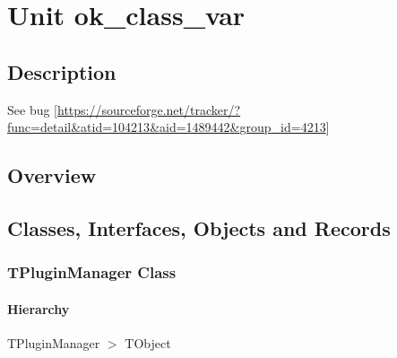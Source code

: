 \documentclass{report}
\newif\ifpdf
\begin{document}
\label{toc}\tableofcontents
\newpage
\newlength{\tmplength}
\chapter{Unit ok{\_}class{\_}var}
\label{ok_class_var}
\section{Description}
See bug [\href{https://sourceforge.net/tracker/?func=detail&atid=104213&aid=1489442&group_id=4213}{https://sourceforge.net/tracker/?func=detail{\&}atid=104213{\&}aid=1489442{\&}group{\_}id=4213}]
\section{Overview}
\begin{description}
\item[\texttt{\begin{ttfamily}TPluginManager\end{ttfamily} Class}]
\end{description}
\section{Classes, Interfaces, Objects and Records}
\ifpdf
\subsection*{\large{\textbf{TPluginManager Class}}\normalsize\hspace{1ex}\hrulefill}
\else
\subsection*{TPluginManager Class}
\fi
\label{ok_class_var.TPluginManager}
\subsubsection*{\large{\textbf{Hierarchy}}\normalsize\hspace{1ex}\hfill}
TPluginManager {$>$} TObject
\end{document}
